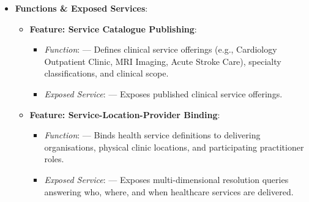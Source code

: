 \begin{itemize}
\begin{itemize}
\begin{enumerate}
\item
\emph{Where can Service X be obtained?}



\item
\emph{Which Practitioner Roles participate in Service X?}



\end{enumerate}


\end{itemize}


\item
\textbf{Functions \& Exposed Services}:


\begin{itemize}

\item
\textbf{Feature: Service Catalogue Publishing}:


\begin{itemize}

\item
\emph{Function}: \texttt{} — Defines clinical service offerings (e.g., Cardiology Outpatient Clinic, MRI Imaging, Acute Stroke Care), specialty classifications, and clinical scope.



\item
\emph{Exposed Service}: \texttt{} — Exposes published clinical service offerings.



\end{itemize}


\item
\textbf{Feature: Service-Location-Provider Binding}:


\begin{itemize}

\item
\emph{Function}: \texttt{} — Binds health service definitions to delivering organisations, physical clinic locations, and participating practitioner roles.



\item
\emph{Exposed Service}: \texttt{} — Exposes multi-dimensional resolution queries answering who, where, and when healthcare services are delivered.




\end{itemize}
\end{itemize}
\end{itemize}
